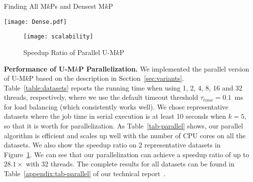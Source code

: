 \documentclass[sigconf, nonacm]{acmart}
\begin{document}

\setcounter{table}{6}

\begin{table}
  \caption{Finding All M$k$Ps and Densest M$k$P}\label{tab-dense}
  \vspace{-3mm}
  \texttt{[image: Dense.pdf]}
  \vspace{-3mm}
\end{table}

\begin{figure}[t]
  \texttt{[image: scalability]}
  \vspace{-4mm}
  \caption{Speedup Ratio of Parallel U-M$k$P}\label{fig:speedup}
\end{figure}

\setcounter{table}{8}

\vspace{1mm}
\noindent\textbf{Performance of U-M$k$P Parallelization.} 
We implemented the parallel version of U-M$k$P based on the description in Section~\ref{sec:variants}. Table~\ref{table:datasets} reports the running time when using 1, 2, 4, 8, 16 and 32 threads, respectively, where we use the default timeout threshold $\tau_{time}=0.1$~ms for load balancing (which consistently works well). We chose representative datasets where the job time in serial execution is at least 10 seconds when $k=5$, so that it is worth for parallelization. 
%
As Table~\ref{tab-parallel} shows, our parallel algorithm is efficient and scales up well with the number of CPU cores on all the datasets. We also show the speedup ratio on 2 representative datasets in Figure~\ref{fig:speedup}. We can see that our parallelization can achieve a speedup ratio of up to $28.1\times$ with 32 threads. 
The complete results for all datasets can be found in Table~\ref{appendix:tab-parallel} of our technical report~\cite{tech_report}.
\end{document}
